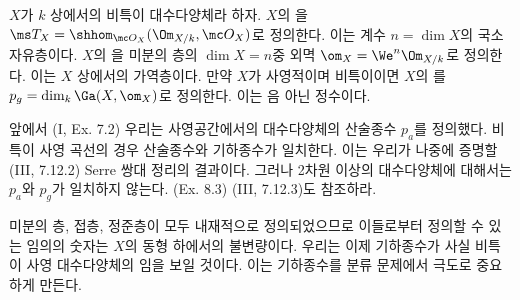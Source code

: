 	
	\begin{definition}
	$X$가 $k$ 상에서의 비특이 대수다양체라 하자.
	$X$의 을 $\ms T_X=\shhom_{\mc O_X}(\Om_{X/k},\mc O_X)$로 정의한다. 이는 계수 $n=\dim X$의 국소자유층이다.
	$X$의 을 미분의 층의 $\dim X=n$중 외멱 $\om_X=\We^n\Om_{X/k}$로 정의한다. 이는 $X$ 상에서의 가역층이다.
	만약 $X$가 사영적이며 비특이이면 $X$의 를 $p_g=\dim_k\Ga(X,\om_X)$로 정의한다. 이는 음 아닌 정수이다.
	\end{definition}
	
	
	\begin{remark}
	앞에서 (I, Ex. 7.2) 우리는 사영공간에서의 대수다양체의 산술종수 $p_a$를 정의했다.
	비특이 사영 곡선의 경우 산술종수와 기하종수가 일치한다. 이는 우리가 나중에 증명할 (III, 7.12.2) Serre 쌍대 정리의 결과이다.
	그러나 2차원 이상의 대수다양체에 대해서는 $p_a$와 $p_g$가 일치하지 않는다. (Ex. 8.3) (III, 7.12.3)도 참조하라.
	\end{remark}
	
	
	\begin{remark}
	미분의 층, 접층, 정준층이 모두 내재적으로 정의되었으므로 이들로부터 정의할 수 있는 임의의 숫자는 $X$의 동형 하에서의 불변량이다.
	우리는 이제 기하종수가 사실 비특이 사영 대수다양체의 임을 보일 것이다.
	이는 기하종수를 분류 문제에서 극도로 중요하게 만든다.
	\end{remark}
	
